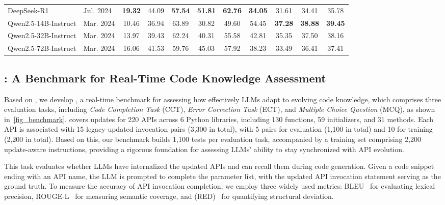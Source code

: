\begin{table*}[!t]
\begin{minipage}[t]{\linewidth}
\begin{tabular}{ll|ccc|ccc|ccc}
        DeepSeek-R1 & Jul. 2024 & \cellcolor{lightblue}\textbf{19.32} & 44.09 & \cellcolor{lightblue}\textbf{57.54} & \cellcolor{lightblue}\textbf{51.81} & \cellcolor{lightblue}\textbf{62.76} & \cellcolor{lightblue}\textbf{34.05} & 31.61 & 34.41 & 35.78 \\
        Qwen2.5-14B-Instruct & Mar. 2024 & 10.46 & 36.94 & 63.89 & 30.82 & 49.60 & 54.45 & \cellcolor{lightblue}\textbf{37.28} & \cellcolor{lightblue}\textbf{38.88} & \cellcolor{lightblue}\textbf{39.45} \\
        Qwen2.5-32B-Instruct & Mar. 2024 & 13.97 & 39.43 & 62.24 & 40.31 & 55.58 & 42.81 & 35.35 & 37.50 & 38.16 \\
        Qwen2.5-72B-Instruct & Mar. 2024 & 16.06 & 41.53 & 59.76 & 45.03 & 57.92 & 38.23 & 33.49 & 36.41 & 37.41 \\
        \bottomrule
    \end{tabular}
    \label{tab_RQ1}
    \vspace{-1em}
\end{minipage}
\end{table*}

\subsection{\benchmark: A Benchmark for Real-Time Code Knowledge Assessment}
\label{sec_benchmark}
Based on \method, we develop \benchmark, a real-time benchmark for assessing how effectively LLMs adapt to evolving code knowledge, which comprises three evaluation tasks, including \textit{Code Completion Task} (CCT), \textit{Error Correction Task} (ECT), and \textit{Multiple Choice Question} (MCQ), as shown in~\autoref{fig_benchmark}. \benchmark covers updates for 220 APIs across 6 Python libraries, including 130 functions, 59 initializers, and 31 methods. Each API is associated with 15 legacy-updated invocation pairs (3,300 in total), with 5 pairs for evaluation (1,100 in total) and 10 for training (2,200 in total). Based on this, our benchmark builds 1,100 tests per evaluation task, accompanied by a training set comprising 2,200 update-aware instructions, providing a rigorous foundation for assessing LLMs’ ability to stay synchronized with API evolution.

This task evaluates whether LLMs have internalized the updated APIs and can recall them during code generation. Given a code snippet ending with an API name, the LLM is prompted to complete the parameter list, with the updated API invocation statement serving as the ground truth. To measure the accuracy of API invocation completion, we employ three widely used metrics: BLEU~\cite{papineni2002bleu} for evaluating lexical precision, ROUGE-L~\cite{lin2004rouge} for measuring semantic coverage, and  (RED)~\cite{ristad1998EditInstance} for quantifying structural deviation.

